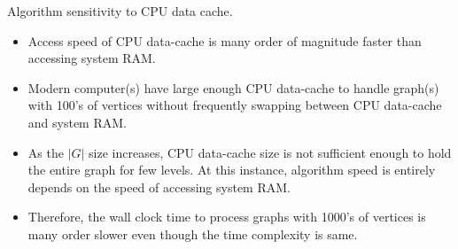 \documentclass[landscape]{slides}
\begin{document}
\begin{slide}
	\begin{center}
		Algorithm sensitivity to CPU data cache.
	\end{center}
	\begin{itemize}
		\setlength{\itemsep}{0pt}
		\setlength{\parskip}{20pt}
		\setlength{\parsep}{0pt}
		\item Access speed of CPU data-cache is many order of magnitude faster than accessing system RAM.
		\item Modern computer(s) have large enough CPU data-cache to handle graph(s) with 100's of vertices without frequently swapping between CPU data-cache and system RAM.
		\item As the $|G|$ size increases, CPU data-cache size is not sufficient enough to hold the entire graph for few levels. At this instance, algorithm speed is entirely depends on the speed of accessing system RAM.
		\item Therefore, the wall clock time to process graphs with 1000's of vertices is many order slower even though the time complexity is same.
	\end{itemize}
\end{slide}
\end{document}
